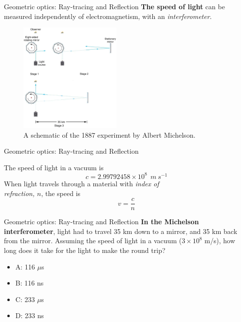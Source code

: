 \documentclass{beamer}
\begin{document}
\begin{frame}{Geometric optics: Ray-tracing and Reflection}
\small
\textbf{\alert{The speed of light}} can be measured independently of electromagnetism, with an \textit{interferometer.}
\begin{figure}
\centering
\includegraphics[width=0.45\textwidth]{figures/michelson.png}
\caption{\label{fig:mich} A schematic of the 1887 experiment by Albert Michelson.}
\end{figure}
\end{frame}

\begin{frame}{Geometric optics: Ray-tracing and Reflection}
\begin{tcolorbox}[colback=white,colframe=black!40!black,title=The Speed of Light]
\alert{The speed of light in a vacuum is
\begin{equation}
c = 2.99792458 \times 10^8~~m~s^{-1}
\end{equation}
When light travels through a material with \textit{index of \\ refraction, $n$}, the speed is
\begin{equation}
v = \frac{c}{n}
\end{equation}
}
\end{tcolorbox}
\end{frame}

\begin{frame}{Geometric optics: Ray-tracing and Reflection}
\textbf{In the Michelson interferometer}, light had to travel 35 km down to a mirror, and 35 km back from the mirror.  Assuming the speed of light in a vacuum ($3\times 10^8$ m/s), how long does it take for the light to make the round trip?
\begin{itemize}
\item A: 116 $\mu$s
\item B: 116 ns
\item C: 233 $\mu$s
\item D: 233 ns
\end{itemize}
\end{frame}
\end{document}
